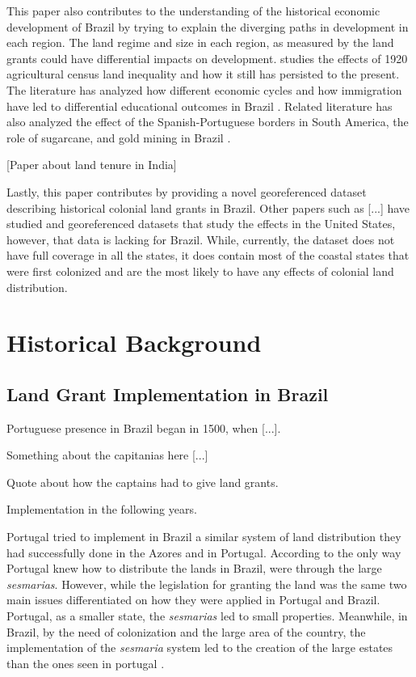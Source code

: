 \documentclass{article}
\begin{document}
This paper also contributes to the understanding of the historical economic development of Brazil by trying to explain the diverging paths in development in each region. 
The land regime and size in each region, as measured by the land grants could have differential impacts on development.
\textcite{Wigton-Jones2020-ex} studies the effects of 1920 agricultural census land inequality and how it still has persisted to the present.
The literature has analyzed how different economic cycles and how immigration have led to differential educational outcomes in Brazil \parencites{Musacchio2014-pq}{Rocha2017-yq}.
Related literature has also analyzed the effect of the Spanish-Portuguese borders in South America, the role of sugarcane, and gold mining in Brazil \parencites{Laudares2022-vy}{Naritomi2012-or}.

\parencite{Dell2010-qt}
\parencite{Sokoloff2000-mb}

\textcite{Ratnoo2023-vw} [Paper about land tenure in India]

\textcite{Albertus2018-bf}

Lastly, this paper contributes by providing a novel georeferenced dataset describing historical colonial land grants in Brazil. 
Other papers such as [...] have studied and georeferenced datasets that study the effects in the United States, however, that data is lacking for Brazil.
While, currently, the dataset does not have full coverage in all the states, it does contain most of the coastal states that were first colonized and are the most likely to have any effects of colonial land distribution.


\section{Historical Background}

\subsection{Land Grant Implementation in Brazil}

Portuguese presence in Brazil began in 1500, when [...].

Something about the capitanias here [...] 

Quote about how the captains had to give land grants. 

Implementation in the following years.

Portugal tried to implement in Brazil a similar system of land distribution they had successfully done in the Azores and in Portugal. 
According to \textcite{Smith1944-oi} the only way Portugal knew how to distribute the lands in Brazil, were through the large \textit{sesmarias}.
However, while the legislation for granting the land was the same two main issues differentiated on how they were applied in Portugal and Brazil. 
Portugal, as a smaller state, the \textit{sesmarias} led to small properties. 
Meanwhile, in Brazil, by the need of colonization and the large area of the country, the implementation of the \textit{sesmaria} system led to the creation of the large estates than the ones seen in portugal \parencites[p.~58-59]{Da_Costa_Porto1979-dz}[p.~28]{Diffie1987-bw}[p.~23-24]{Panini1990-rj}.
\end{document}
